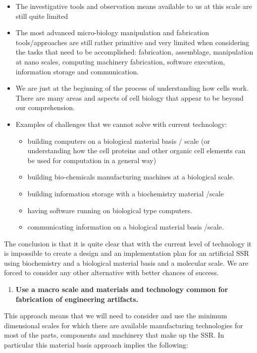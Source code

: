\documentclass[letterpaper]{article}
\begin{document}
\bigskip

\begin{itemize}
\item The investigative tools and observation means available to us at
this scale are still quite limited
\item The most advanced micro-biology manipulation and fabrication
tools/approaches are still rather primitive and very limited when
considering the tasks that need to be accomplished: fabrication,
assemblage, manipulation at nano scales, computing machinery
fabrication, software execution, information storage and communication.
\item We are just at the beginning of the process of understanding how
cells work. There are many areas and aspects of cell biology that
appear to be beyond our comprehension.
\item Examples of challenges that we cannot solve with current
technology: 

\begin{itemize}
\item building computers on a biological material basis / scale (or
understanding how the cell proteins and other organic cell elements can
be used for computation in a general way)
\item building bio-chemicals manufacturing machines at a biological
scale.
\item building information storage with a biochemistry material /scale
\item having software running on biological type computers.
\item communicating information on a biological material basis /scale.
\end{itemize}
\end{itemize}
The conclusion is that it is quite clear that with the current level of
technology it is impossible to create a design and an implementation
plan for an artificial SSR using biochemistry and a biological material
basis and a molecular scale. We are forced to consider any other
alternative with better chances of success.


\bigskip

\begin{enumerate}
\item \textbf{Use a macro scale and materials and technology common for
fabrication of engineering artifacts.}
\end{enumerate}
This approach means that we will need to consider and use the minimum
dimensional scales for which there are available manufacturing
technologies for most of the parts, components and machinery that make
up the SSR.  In particular this material basis approach implies the
following:
\end{document}
